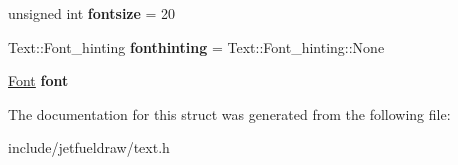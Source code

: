 \begin{DoxyCompactItemize}
unsigned int {\bfseries fontsize} = 20
\item 
\mbox{\label{structjetfuel_1_1draw_1_1Text_1_1Text__characteristics_a31bbd621131af532165eddc906a9e473}} 
Text\+::\+Font\+\_\+hinting {\bfseries fonthinting} = Text\+::\+Font\+\_\+hinting\+::\+None
\item 
\mbox{\label{structjetfuel_1_1draw_1_1Text_1_1Text__characteristics_ae3114e3dbb62a37fa1be23ab0fc88839}} 
\hyperlink{classjetfuel_1_1draw_1_1Font}{Font} {\bfseries font}
\end{DoxyCompactItemize}


The documentation for this struct was generated from the following file\+:\begin{DoxyCompactItemize}
\item 
include/jetfueldraw/text.\+h\end{DoxyCompactItemize}
